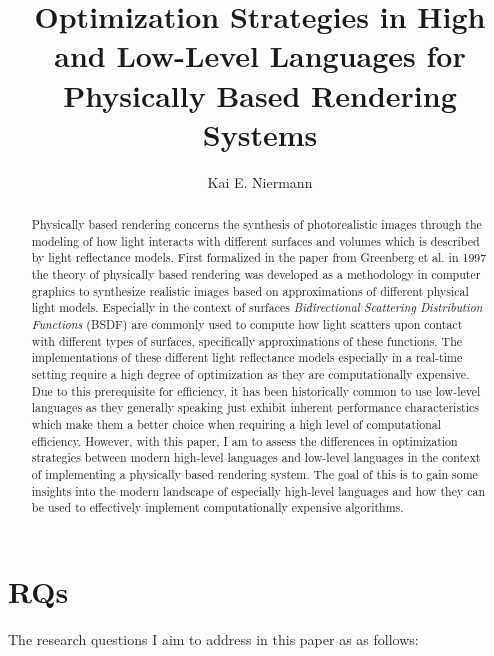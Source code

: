 \documentclass[11pt,a4paper,oneside]{article}
\begin{document}

\title{
    \textbf{Optimization Strategies in High and Low-Level Languages for Physically Based Rendering Systems}
}
\author{
Kai E. Niermann 
}
\date{}
\maketitle
% 

\begin{abstract}
    Physically based rendering concerns the synthesis of photorealistic images through the modeling of how light interacts with different surfaces and volumes which is described by light reflectance models. First formalized in the paper from Greenberg et al. \cite{10.1145/310930.310970} in 1997 the theory of physically based rendering was developed as a methodology in computer graphics to synthesize realistic images based on approximations of different physical light models. Especially in the context of surfaces \textit{Bidirectional Scattering Distribution Functions} (BSDF) are commonly used to compute how light scatters upon contact with different types of surfaces, specifically approximations of these functions. The implementations of these different light reflectance models especially in a real-time setting require a high degree of optimization as they are computationally expensive. Due to this prerequisite for efficiency, it has been historically common to use low-level languages as they generally speaking just exhibit inherent performance characteristics which make them a better choice when requiring a high level of computational efficiency. However, with this paper, I am to assess the differences in optimization strategies between modern high-level languages and low-level languages in the context of implementing a physically based rendering system. The goal of this is to gain some insights into the modern landscape of especially high-level languages and how they can be used to effectively implement computationally expensive algorithms. 
\end{abstract}

\section{RQs}

The research questions I aim to address in this paper as as follows:
\end{document}
